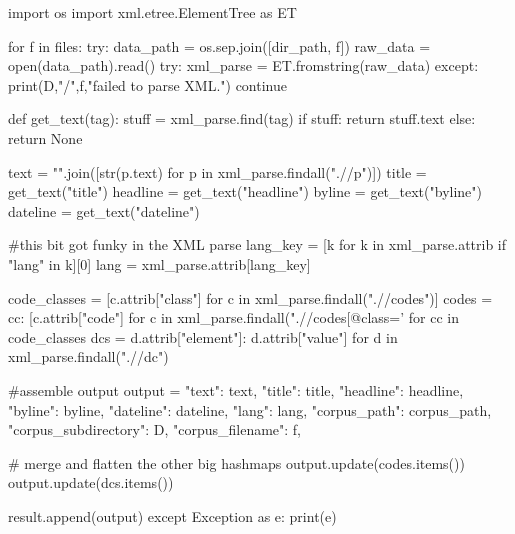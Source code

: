 \begin{lstlisting}[frame=none,caption={Extract and Parse RCV1 XML document into csv.},captionpos=b,label=lst:RCV1Extraction]
\end{lstlisting}
\begin{python}	
	import os
	import xml.etree.ElementTree as ET

	for f in files:
		try:
			data_path = os.sep.join([dir_path, f])
			raw_data = open(data_path).read()
			try:
				xml_parse = ET.fromstring(raw_data)
			except:
				print(D,"/",f,"failed to parse XML.")
				continue
		
			def get_text(tag): 
				stuff = xml_parse.find(tag)
				if stuff: 
					return stuff.text
				else: 
					return None
	
		text = "\n\n".join([str(p.text) for p in xml_parse.findall(".//p")])
		title = get_text("title")
		headline = get_text("headline")
		byline = get_text("byline")
		dateline = get_text("dateline")
		
		#this bit got funky in the XML parse
		lang_key = [k for k in xml_parse.attrib if "lang" in k][0]
		lang = xml_parse.attrib[lang_key]
	
		code_classes = [c.attrib["class"] 
		for c in xml_parse.findall(".//codes")]
		codes = {cc: [c.attrib["code"] for c in 
			xml_parse.findall(".//codes[@class='%
			for cc in code_classes}
		dcs = {d.attrib["element"]: d.attrib["value"] 
			for d in xml_parse.findall(".//dc")}
		
		#assemble output
		output = {"text": text,
			"title": title,
			"headline": headline,
			"byline": byline,
			"dateline": dateline,
			"lang": lang,
			"corpus_path": corpus_path,
			"corpus_subdirectory": D,
			"corpus_filename": f,
		}
		
		# merge and flatten the other big hashmaps
		output.update(codes.items())
		output.update(dcs.items())
		
		result.append(output)
	except Exception as e:
		print(e)
\end{python}


